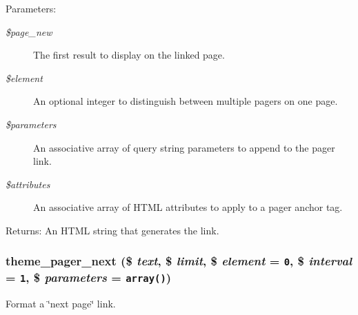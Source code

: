 \begin{Desc}
\item[Parameters:]
\begin{description}
\item[{\em \$page\_\-new}]The first result to display on the linked page. \item[{\em \$element}]An optional integer to distinguish between multiple pagers on one page. \item[{\em \$parameters}]An associative array of query string parameters to append to the pager link. \item[{\em \$attributes}]An associative array of HTML attributes to apply to a pager anchor tag. \end{description}
\end{Desc}
\begin{Desc}
\item[Returns:]An HTML string that generates the link. \end{Desc}
\hypertarget{group__themeable_g69523320b2d45d957066b2428a19f5fa}{
\subsubsection[{theme\_\-pager\_\-next}]{\setlength{\rightskip}{0pt plus 5cm}theme\_\-pager\_\-next (\$ {\em text}, \/  \$ {\em limit}, \/  \$ {\em element} = {\tt 0}, \/  \$ {\em interval} = {\tt 1}, \/  \$ {\em parameters} = {\tt array()})}}
\label{group__themeable_g69523320b2d45d957066b2428a19f5fa}


Format a \char`\"{}next page\char`\"{} link.

